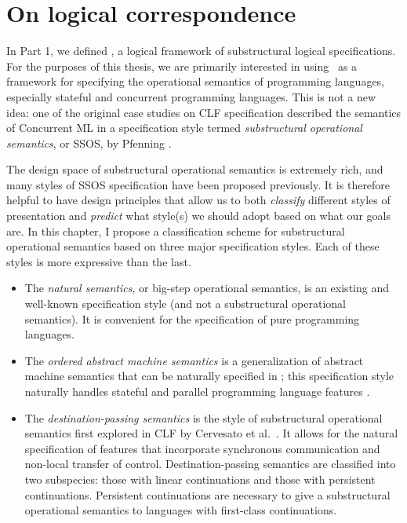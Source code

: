 \chapter{On logical correspondence}

In Part 1, we defined \sls, a logical framework of substructural
logical specifications. For the purposes of this thesis, we are
primarily interested in using \sls~as a framework for specifying the
operational semantics of programming languages, especially stateful
and concurrent programming languages. This is not a new idea: one of
the original case studies on CLF specification described the semantics
of Concurrent ML \cite{cervesato02concurrent} in a specification style
termed {\it substructural operational semantics}, or SSOS, by Pfenning
\cite{pfenning04substructural}. 

The design space of substructural operational semantics is extremely
rich, and many styles of SSOS specification have been proposed
previously. It is therefore helpful to have design principles that
allow us to both {\it classify} different styles of presentation and
{\it predict} what style(s) we should adopt based on what our goals
are. In this chapter, I propose a classification scheme for
substructural operational semantics based on three major specification
styles.  Each of these styles is more expressive than the last.

\begin{itemize}
\item The {\it natural semantics}, or big-step operational semantics,
  is an existing and well-known specification style (and not a
  substructural operational semantics). It is convenient for the
  specification of pure programming languages.

\item The {\it ordered abstract machine semantics} is a generalization
  of abstract machine semantics that can be naturally specified in
  \sls; this specification style naturally handles stateful and
  parallel programming language features
  \cite{pfenning09substructural}.

\item The {\it destination-passing semantics} is the style of
  substructural operational semantics first explored in CLF by
  Cervesato et al.~\cite{cervesato02concurrent}. It allows for the
  natural specification of features that incorporate synchronous
  communication and non-local transfer of control. Destination-passing
  semantics are classified into two subspecies: those with linear
  continuations and those with persistent continuations. Persistent
  continuations are necessary to give a substructural operational
  semantics to languages with first-class continuations.
\end{itemize}


